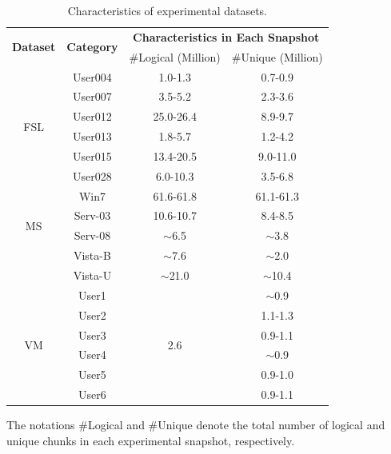 \documentclass[bachelor]{thesis-uestc}
\begin{document}
\begin{table}[!t]
    \caption{Characteristics of experimental datasets.}
\small
\label{tab:dataset}
\renewcommand{\arraystretch}{1.2}
\vspace{-3pt}
\centering
\begin{tabular}{|c|c|c|c|}
\hline
 \multirow{2}{*}{\bf Dataset} & \multirow{2}{*}{\bf Category} & \multicolumn{2}{c|}{\bf Characteristics in Each Snapshot} \\
\cline{3-4}
    & &  \#Logical (Million) & \#Unique (Million) \\
\hline
    \multirow{6}{*}{FSL} & User004  & 1.0-1.3 & 0.7-0.9\\
 \cline{2-4}
              & User007 &  3.5-5.2 & 2.3-3.6 \\
 \cline{2-4}
              & User012 &  25.0-26.4 & 8.9-9.7 \\
\cline{2-4}
              & User013 &  1.8-5.7 & 1.2-4.2 \\
\cline{2-4}
              & User015 &  13.4-20.5 & 9.0-11.0 \\
\cline{2-4}
              & User028 &  6.0-10.3 & 3.5-6.8 \\
\hline
\hline
    \multirow{4}{*}{MS} & Win7  & 61.6-61.8 & 61.1-61.3\\
\cline{2-4}
              & Serv-03 & 10.6-10.7 & 8.4-8.5\\
\cline{2-4}
              & Serv-08 & $\sim$6.5 & $\sim$3.8 \\
\cline{2-4}
              & Vista-B &  $\sim$7.6 & $\sim$2.0\\
\cline{2-4}
              & Vista-U &  $\sim$21.0 & $\sim$10.4 \\
\hline
\hline

    \multirow{6}{*}{VM} & User1  &  \multirow{6}{*}{2.6} & $\sim$0.9 \\
\cline{2-2}
\cline{4-4}
              & User2 &  & 1.1-1.3 \\
\cline{2-2}
\cline{4-4}
              & User3 &  & 0.9-1.1 \\
\cline{2-2}
\cline{4-4}
              & User4 &  & $\sim$0.9 \\
\cline{2-2}
\cline{4-4}
              & User5 &  & 0.9-1.0 \\
\cline{2-2}
\cline{4-4}
              & User6 &  & 0.9-1.1 \\
\hline
\end{tabular}
\medskip

\raggedright
    The notations \#Logical and \#Unique denote the total number of logical and unique chunks in each experimental snapshot, respectively. 
\end{table}
\end{document}
